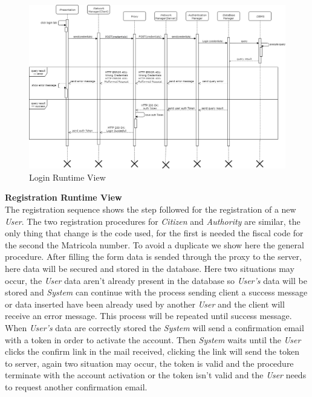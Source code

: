 \documentclass{article}
\begin{document}
\begin{figure}[H]
    \centering
    \includegraphics[scale=0.4]{img/sequence_diagrams/login_sequence.png}
    \caption{Login Runtime View}
\end{figure}  

\clearpage
\textbf{Registration Runtime View}\\
The registration sequence shows the step followed for the 
registration of a new \textit{User}. The two registration procedures for \textit{Citizen} and  
\textit{Authority} are similar, the only thing that change is the code used, for the first is 
needed the fiscal code for the second the Matricola number. To avoid a duplicate we show here 
the general procedure. After filling the form data is sended through the proxy to the server, 
here data will be secured and stored in the database. Here two situations may occur, the \textit{User} 
data aren't already present in the database so \textit{User's} data will be stored and \textit{System} 
can continue with the process sending client a success message or data inserted have been already used 
by another \textit{User} and the client will receive an error message. This process will be repeated 
until success message. When \textit{User's} data are correctly stored the \textit{System} will send a 
confirmation email with a token in order to activate the account. Then \textit{System} waits until the 
\textit{User} clicks the confirm link in the mail received, clicking the link will send the token to 
server, again two situation may occur, the token is valid and the procedure terminate with the account 
activation or the token isn't valid and the \textit{User} needs to request another confirmation email.
\end{document}
